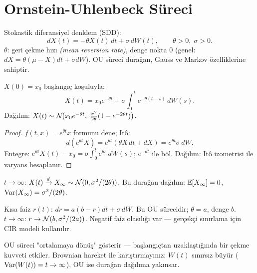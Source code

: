 \section{Ornstein-Uhlenbeck Süreci}
\label{sec:ou_sureci}

\begin{tanim}\label{def:ou}
Stokastik diferansiyel denklem (SDD):
\[
  dX(t) = -\theta X(t)\,dt + \sigma\,dW(t), \qquad \theta>0,\;\sigma>0.
\]
$\theta$: geri çekme hızı \emph{(mean reversion rate)}, denge nokta $0$ (genel: $dX=\theta(\mu-X)dt+\sigma dW$). OU süreci durağan, Gauss ve Markov özelliklerine sahiptir.
\end{tanim}

\begin{teorem}\label{thm:ou_cozum}
$X(0)=x_0$ başlangıç koşuluyla:
\[
  X(t) = x_0 e^{-\theta t} + \sigma\int_0^t e^{-\theta(t-s)}\,dW(s).
\]
Dağılım: $X(t)\sim\mathcal{N}\!\bigl(x_0 e^{-\theta t},\;\tfrac{\sigma^2}{2\theta}(1-e^{-2\theta t})\bigr)$.
\end{teorem}

\begin{proof}
$f(t,x)=e^{\theta t}x$ formunu dene; Itô:
\[
  d(e^{\theta t}X) = e^{\theta t}(\theta X\,dt + dX) = e^{\theta t}\sigma\,dW.
\]
Entegre: $e^{\theta t}X(t) - x_0 = \sigma\int_0^t e^{\theta s}\,dW(s)$; $e^{-\theta t}$ ile böl. Dağılım: Itô izometrisi ile varyans hesaplanır.
\end{proof}

\begin{teorem}\label{thm:ou_duraganlik}
$t\to\infty$: $X(t)\xrightarrow{d} X_\infty\sim\mathcal{N}(0,\sigma^2/(2\theta))$. Bu durağan dağılım: $\mathbb{E}[X_\infty]=0$, $\operatorname{Var}(X_\infty)=\sigma^2/(2\theta)$.
\end{teorem}

\begin{ornek}
Kısa faiz $r(t)$: $dr = a(b-r)dt + \sigma\,dW$. Bu OU sürecidir; $\theta=a$, denge $b$. $t\to\infty$: $r\to\mathcal{N}(b, \sigma^2/(2a))$. Negatif faiz olasılığı var --- gerçekçi sınırlama için CIR modeli kullanılır.
\end{ornek}

\begin{hataanalizi}
OU süreci "ortalamaya dönüş" gösterir --- başlangıçtan uzaklaştığında bir çekme kuvveti etkiler. Brownian hareket ile karıştırmayınız: $W(t)$ sınırsız büyür ($\operatorname{Var}(W(t))=t\to\infty$), OU ise durağan dağılıma yakınsar.
\end{hataanalizi}

